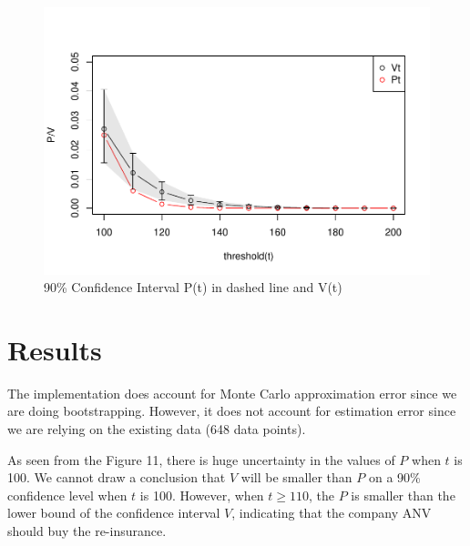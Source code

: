 \documentclass[11pt,]{article}
\begin{document}
\begin{figure}
\centering
\includegraphics{figs/unnamed-chunk-31.pdf}
\caption{90\% Confidence Interval P(t) in dashed line and V(t)}
\end{figure}

\hypertarget{results}{%
\section{Results}\label{results}}

The implementation does account for Monte Carlo approximation error
since we are doing bootstrapping. However, it does not account for
estimation error since we are relying on the existing data (648 data
points).

As seen from the Figure 11, there is huge uncertainty in the values of
\(P\) when \(t\) is 100. We cannot draw a conclusion that \(V\) will be
smaller than \(P\) on a 90\% confidence level when \(t\) is 100.
However, when \(t\geq110\), the \(P\) is smaller than the lower bound of
the confidence interval \(V\), indicating that the company ANV should
buy the re-insurance.





\newpage
\singlespacing 

\end{document}
